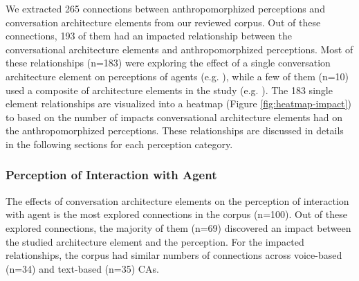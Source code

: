\documentclass[sigconf,screen,review, anonymous]{acmart}
\newcommand{\cmt}[1]{}%
\begin{document}
We extracted 265 connections between anthropomorphized perceptions and conversation architecture elements from our reviewed corpus. Out of these connections, 193 of them had an impacted relationship between the conversational architecture elements and anthropomorphized perceptions. Most of these relationships (n=183) were exploring the effect of a single conversation architecture element on perceptions of agents (e.g. \cite{miehle2018exploring}\cmt{[51]}\cite{westerman2019believe}\cmt{[9]}), while a few of them (n=10) used a composite of architecture elements in the study (e.g. \cite{seeger2021chatbots}\cmt{[35]}\cite{volkel2021manipulating}\cmt{[68]}). The 183 single element relationships are visualized into a heatmap (Figure \ref{fig:heatmap-impact}) to based on the number of impacts conversational architecture elements had on the anthropomorphized perceptions. These relationships are discussed in details in the following sections for each perception category.


 


\subsubsection{Perception of Interaction with Agent}

The effects of conversation architecture elements on the perception of interaction with agent is the most explored connections in the corpus (n=100). Out of these explored connections, the majority of them (n=69) discovered an impact between the studied architecture element and the perception. For the impacted relationships, the corpus had similar numbers of connections across voice-based (n=34) and text-based (n=35) CAs.
\end{document}
